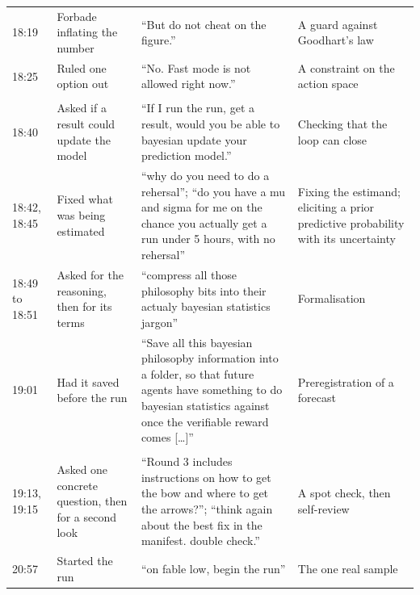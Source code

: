 \documentclass[11pt,a4paper]{article}
\begin{document}
\begin{table}[!tbp]
\begin{tabularx}{\textwidth}{@{}l>{\raggedright\arraybackslash}p{}>{\raggedright\arraybackslash}X>{\raggedright\arraybackslash}p{}@{}}
18:19 & Forbade inflating the number & ``But do not cheat on the figure.'' & A guard against Goodhart's law \citep{goodhart1984} \\
18:25 & Ruled one option out & ``No. Fast mode is not allowed right now.'' & A constraint on the action space \\
\addlinespace
\multicolumn{4}{@{}l}{\emph{The forecast}} \\
18:40 & Asked if a result could update the model & ``If I run the run, get a result, would you be able to bayesian update your prediction model.'' & Checking that the loop can close \\
18:42, 18:45 & Fixed what was being estimated & ``why do you need to do a rehersal''; ``do you have a mu and sigma for me on the chance you actually get a run under 5 hours, with no rehersal'' & Fixing the estimand; eliciting a prior predictive probability with its uncertainty \\
18:49 to 18:51 & Asked for the reasoning, then for its terms & ``compress all those philosophy bits into their actualy bayesian statistics jargon'' & Formalisation \\
19:01 & Had it saved before the run & ``Save all this bayesian philosopby information into a folder, so that future agents have something to do bayesian statistics against once the verifiable reward comes [\ldots]'' & Preregistration of a forecast \citep{nosek2018} \\
\addlinespace
\multicolumn{4}{@{}l}{\emph{Verification}} \\
19:13, 19:15 & Asked one concrete question, then for a second look & ``Round 3 includes instructions on how to get the bow and where to get the arrows?''; ``think again about the best fix in the manifest. double check.'' & A spot check, then self-review \\
20:57 & Started the run & ``on fable low, begin the run'' & The one real sample \\
\bottomrule
\end{tabularx}
\end{table}
\end{document}
